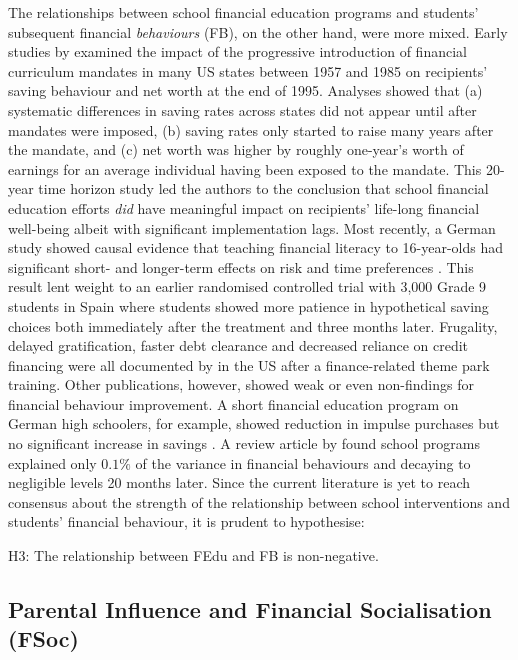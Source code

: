 \documentclass[a4paper,11pt,UKenglish,twoside,openright]{report}\usepackage[]{graphicx}\usepackage[]{color}
\begin{document}
The relationships between school financial education programs and students' subsequent financial \emph{behaviours} (FB), on the other hand, were more mixed. Early studies by \textcite{bernheim:2001} examined the impact of the progressive introduction of financial curriculum mandates in many US states between 1957 and 1985 on recipients' saving behaviour and net worth at the end of 1995. Analyses showed that (a) systematic differences in saving rates across states did not appear until after mandates were imposed, (b) saving rates only started to raise many years after the mandate, and (c) net worth was higher by roughly one-year's worth of earnings for an average individual having been exposed to the mandate. This 20-year time horizon study led the authors to the conclusion that school financial education efforts \emph{did} have meaningful impact on recipients' life-long financial well-being albeit with significant implementation lags. Most recently, a German study showed causal evidence that teaching financial literacy to 16-year-olds had significant short- and longer-term effects on risk and time preferences \parencite{sutter:2020}. This result lent weight to an earlier randomised controlled trial with 3,000 Grade 9 students in Spain \parencite{bover:2018} where students showed more patience in hypothetical saving choices both immediately after the treatment and three months later. Frugality, delayed gratification, faster debt clearance and decreased reliance on credit financing were all documented by \textcite{carlin:2012b} in the US after a finance-related theme park training. Other publications, however, showed weak or even non-findings for financial behaviour improvement. A short financial education program on German high schoolers, for example, showed reduction in impulse purchases but no significant increase in savings \parencite{luhrmann:2015}. A review article by \textcite{fernandes:2014} found school programs explained only $0.1\%$ of the variance in financial behaviours and decaying to negligible levels 20 months later. Since the current literature is yet to reach consensus about the strength of the relationship between school interventions and students' financial behaviour, it is prudent to hypothesise:
\begin{hyth}
    \item[H3:] The relationship between FEdu and FB is non-negative.
\end{hyth}

\subsection{Parental Influence and Financial Socialisation (FSoc)}
\end{document}
